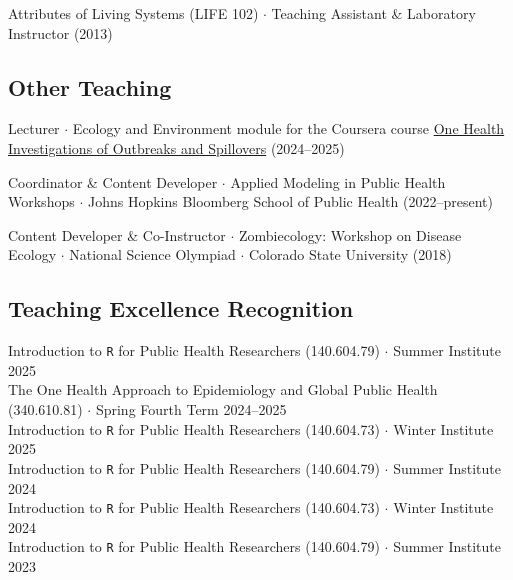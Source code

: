 \documentclass{cv}
\begin{document}
Attributes of Living Systems (LIFE 102) $\cdot$ Teaching Assistant \& Laboratory Instructor (2013)

\subsection*{Other Teaching}

Lecturer $\cdot$ Ecology and Environment module for the Coursera course \href{https://www.coursera.org/learn/one-health-investigations-of-outbreaks-and-spillover-events}{One Health Investigations of Outbreaks and Spillovers} (2024--2025)

Coordinator \& Content Developer $\cdot$ Applied Modeling in Public Health Workshops $\cdot$ Johns Hopkins Bloomberg School of Public Health (2022--present)

Content Developer \& Co-Instructor $\cdot$ Zombiecology: Workshop on Disease Ecology $\cdot$ National Science Olympiad $\cdot$ Colorado State University (2018)






\subsection*{Teaching Excellence Recognition}

Introduction to \texttt{R} for Public Health Researchers (140.604.79) $\cdot$ Summer Institute 2025 \\
The One Health Approach to Epidemiology and Global Public Health (340.610.81) $\cdot$ Spring Fourth Term 2024--2025 \\
Introduction to \texttt{R} for Public Health Researchers (140.604.73) $\cdot$ Winter Institute 2025 \\
Introduction to \texttt{R} for Public Health Researchers (140.604.79) $\cdot$ Summer Institute 2024 \\
Introduction to \texttt{R} for Public Health Researchers (140.604.73) $\cdot$ Winter Institute 2024 \\
Introduction to \texttt{R} for Public Health Researchers (140.604.79) $\cdot$ Summer Institute 2023
\end{document}
